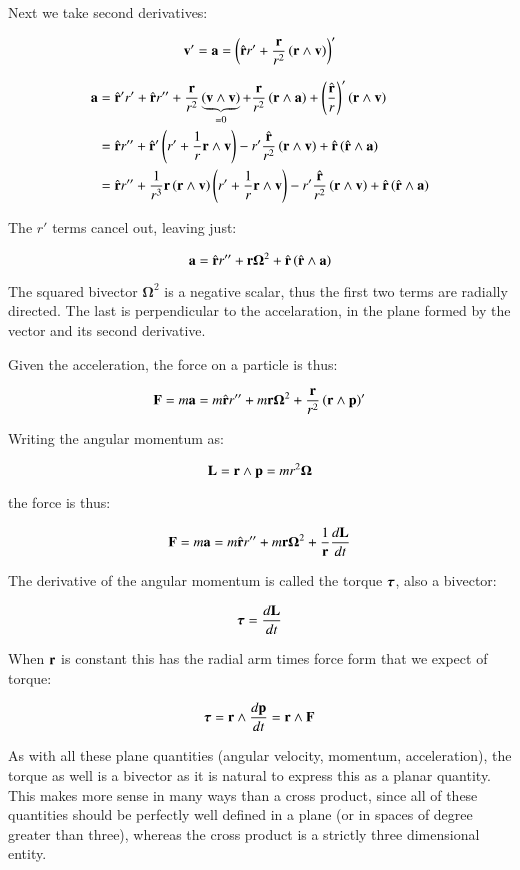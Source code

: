 \documentclass{article}      %
\newcommand{\BOmega}[0]{\boldsymbol{\Omega}}
\begin{document}
Next we take second derivatives:

\[
\mathbf{v}' = \mathbf{a} = \left(\hat{\mathbf{r}} r' + \frac{\mathbf{r}}{r^2} \left(\mathbf{r} \wedge \mathbf{v}\right)\right)'
\]

\begin{align*}
\mathbf{a}
&= \hat{\mathbf{r}}' r' + \hat{\mathbf{r}} r'' + \frac{\mathbf{r}}{r^2} \underbrace{\left(\mathbf{v} \wedge \mathbf{v}\right)}_{=0} + \frac{\mathbf{r}}{r^2} \left(\mathbf{r} \wedge \mathbf{a}\right) + \left(\frac{\hat{\mathbf{r}}}{r}\right)' \left(\mathbf{r} \wedge \mathbf{v}\right) \\
&=
\hat{\mathbf{r}} r''
+\hat{\mathbf{r}}'\left( r'  + \frac{1}{r} \mathbf{r} \wedge \mathbf{v} \right)
- r' \frac{\hat{\mathbf{r}}}{r^2} \left(\mathbf{r} \wedge \mathbf{v}\right)
+ \hat{\mathbf{r}} \left(\hat{\mathbf{r}} \wedge \mathbf{a}\right)  \\
&=
\hat{\mathbf{r}} r''
+\frac{1}{r^3} \mathbf{r}\left( \mathbf{r} \wedge \mathbf{v}\right) \left( r'  + \frac{1}{r} \mathbf{r} \wedge \mathbf{v} \right)
- r' \frac{\hat{\mathbf{r}}}{r^2} \left(\mathbf{r} \wedge \mathbf{v}\right)
+ \hat{\mathbf{r}} \left(\hat{\mathbf{r}} \wedge \mathbf{a}\right)  \\
\end{align*}

The $r'$ terms cancel out, leaving just:

\[
\Ba = \rcap r'' + \Br \BOmega^2 +
\rcap \left(\rcap \wedge \Ba\right)
\]

The squared bivector $\BOmega^2$ is a negative scalar, thus the first two terms are radially directed.  The last is perpendicular to the accelaration, in the plane formed
by the vector and its second derivative.

Given the acceleration, the force on a particle is thus:

\[
\BF = m\Ba = m\rcap r'' + m \Br \BOmega^2 + \frac{\Br}{r^2} \left(\Br \wedge \Bp\right)'
\]

Writing the angular momentum as:

\[
\BL = \Br \wedge \Bp = m r^2 \BOmega
\]

the force is thus:

\[
\BF = m\Ba = m\rcap r'' + m \Br \BOmega^2 + \frac{1}{\Br} \frac{d\BL}{dt}
\]

The derivative of the angular momentum is called the torque $\boldsymbol{\tau}$, also a bivector:

\[
\boldsymbol{\tau} = \frac{d\mathbf{L}}{dt}
\]

When $\mathbf{r}$ is constant this has the radial arm times force form that we expect of torque:

\[
\boldsymbol{\tau} = \mathbf{r} \wedge \frac{d \mathbf{p}}{dt} = \mathbf{r} \wedge \mathbf{F}
\]

As with all these plane quantities (angular velocity, momentum, acceleration), the torque as well is a bivector as it is natural to express this as a planar quantity.  This makes
more sense in many ways than a cross product, since all of these quantities should be perfectly well defined in a plane (or in spaces of degree greater than three), whereas the
cross product is a strictly three dimensional entity.
\end{document}
